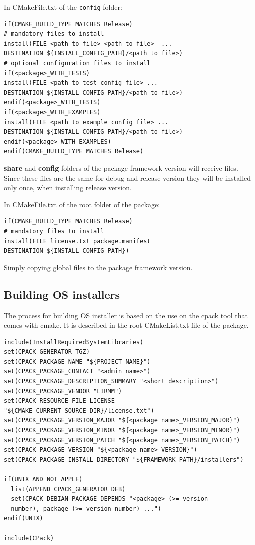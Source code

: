 \documentclass[12pt,a4paper]{article}
\begin{document}
In CMakeFile.txt of the \texttt{config} folder:
\begin{verbatim}
if(CMAKE_BUILD_TYPE MATCHES Release)
# mandatory files to install
install(FILE <path to file> <path to file>  ...
DESTINATION ${INSTALL_CONFIG_PATH}/<path to file>)
# optional configuration files to install
if(<package>_WITH_TESTS)
install(FILE <path to test config file> ...
DESTINATION ${INSTALL_CONFIG_PATH}/<path to file>)
endif(<package>_WITH_TESTS)
if(<package>_WITH_EXAMPLES)
install(FILE <path to example config file> ...
DESTINATION ${INSTALL_CONFIG_PATH}/<path to file>)
endif(<package>_WITH_EXAMPLES)
endif(CMAKE_BUILD_TYPE MATCHES Release)
\end{verbatim}
\textbf{share} and \textbf{config} folders of the package framework version will receive files. Since these files are the same for debug and release version they will be installed only once, when installing release version.

In CMakeFile.txt of the root folder of the package:
\begin{verbatim}
if(CMAKE_BUILD_TYPE MATCHES Release)
# mandatory files to install
install(FILE license.txt package.manifest
DESTINATION ${INSTALL_CONFIG_PATH})
\end{verbatim}
Simply copying global files to the package framework version.


\subsection{Building OS installers}

The process for building OS installer is based on the use on the cpack tool that comes with cmake. It is described in the root CMakeList.txt file of the package.

\begin{verbatim}
include(InstallRequiredSystemLibraries)
set(CPACK_GENERATOR TGZ)
set(CPACK_PACKAGE_NAME "${PROJECT_NAME}")
set(CPACK_PACKAGE_CONTACT "<admin name>")
set(CPACK_PACKAGE_DESCRIPTION_SUMMARY "<short description>")
set(CPACK_PACKAGE_VENDOR "LIRMM")
set(CPACK_RESOURCE_FILE_LICENSE "${CMAKE_CURRENT_SOURCE_DIR}/license.txt")
set(CPACK_PACKAGE_VERSION_MAJOR "${<package name>_VERSION_MAJOR}")
set(CPACK_PACKAGE_VERSION_MINOR "${<package name>_VERSION_MINOR}")
set(CPACK_PACKAGE_VERSION_PATCH "${<package name>_VERSION_PATCH}")
set(CPACK_PACKAGE_VERSION "${<package name>_VERSION}")
set(CPACK_PACKAGE_INSTALL_DIRECTORY "${FRAMEWORK_PATH}/installers")

if(UNIX AND NOT APPLE)
  list(APPEND CPACK_GENERATOR DEB)  
  set(CPACK_DEBIAN_PACKAGE_DEPENDS "<package> (>= version 
  number), package (>= version number) ...")
endif(UNIX)

include(CPack)
\end{verbatim}
\end{document}
